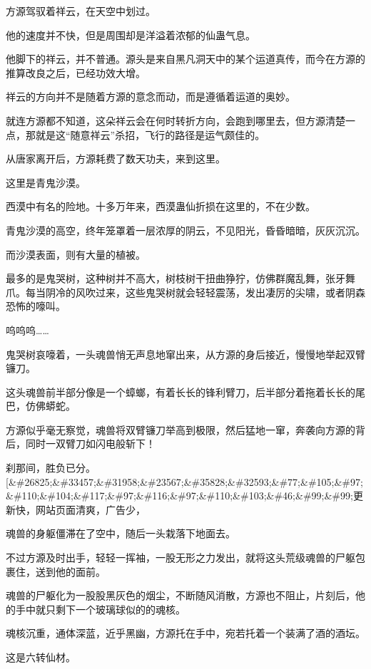
\begin{this_body}

方源驾驭着祥云，在天空中划过。

他的速度并不快，但是周围却是洋溢着浓郁的仙蛊气息。

他脚下的祥云，并不普通。源头是来自黑凡洞天中的某个运道真传，而今在方源的推算改良之后，已经功效大增。

祥云的方向并不是随着方源的意念而动，而是遵循着运道的奥妙。

就连方源都不知道，这朵祥云会在何时转折方向，会跑到哪里去，但方源清楚一点，那就是这“随意祥云”杀招，飞行的路径是运气颇佳的。

从唐家离开后，方源耗费了数天功夫，来到这里。

这里是青鬼沙漠。

西漠中有名的险地。十多万年来，西漠蛊仙折损在这里的，不在少数。

青鬼沙漠的高空，终年笼罩着一层浓厚的阴云，不见阳光，昏昏暗暗，灰灰沉沉。

而沙漠表面，则有大量的植被。

最多的是鬼哭树，这种树并不高大，树枝树干扭曲狰狞，仿佛群魔乱舞，张牙舞爪。每当阴冷的风吹过来，这些鬼哭树就会轻轻震荡，发出凄厉的尖啸，或者阴森恐怖的嚎叫。

呜呜呜……

鬼哭树哀嚎着，一头魂兽悄无声息地窜出来，从方源的身后接近，慢慢地举起双臂镰刀。

这头魂兽前半部分像是一个蟑螂，有着长长的锋利臂刀，后半部分着拖着长长的尾巴，仿佛蟒蛇。

方源似乎毫无察觉，魂兽将双臂镰刀举高到极限，然后猛地一窜，奔袭向方源的背后，同时一双臂刀如闪电般斩下！

刹那间，胜负已分。[\&\#26825;\&\#33457;\&\#31958;\&\#23567;\&\#35828;\&\#32593;\&\#77;\&\#105;\&\#97;\&\#110;\&\#104;\&\#117;\&\#97;\&\#116;\&\#97;\&\#110;\&\#103;\&\#46;\&\#99;\&\#99;更新快，网站页面清爽，广告少，

魂兽的身躯僵滞在了空中，随后一头栽落下地面去。

不过方源及时出手，轻轻一挥袖，一股无形之力发出，就将这头荒级魂兽的尸躯包裹住，送到他的面前。

魂兽的尸躯化为一股股黑灰色的烟尘，不断随风消散，方源也不阻止，片刻后，他的手中就只剩下一个玻璃球似的的魂核。

魂核沉重，通体深蓝，近乎黑幽，方源托在手中，宛若托着一个装满了酒的酒坛。

这是六转仙材。


\end{this_body}
